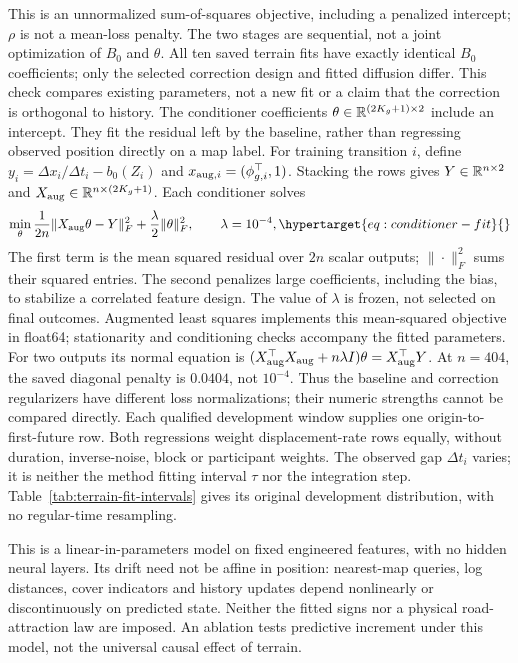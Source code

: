 This is an unnormalized sum-of-squares objective, including a penalized
intercept; \(\rho\) is not a mean-loss penalty. The two stages are sequential,
not a joint optimization of \(B_0\) and \(\theta\). All ten saved terrain fits
have exactly identical \(B_0\) coefficients; only the selected correction
design and fitted diffusion differ. This check compares existing parameters,
not a new fit or a claim that the correction is orthogonal to history.
The conditioner coefficients \(\theta\in\mathbb{R}^{(2K_g+1)\times2}\)
include an intercept. They fit the residual left by the baseline, rather than
regressing observed position directly on a map label.
For training transition \(i\), define
\(y_i=\Delta x_i/\Delta t_i-b_0(Z_i)\) and
\(x_{{\rm aug},i}=(\phi_{g,i}^\top,1)\).
Stacking the rows gives \(Y\in\mathbb{R}^{n\times2}\) and
\(X_{\rm aug}\in\mathbb{R}^{n\times(2K_g+1)}\).
Each conditioner solves
\begin{equation}
 \min_\theta\frac{1}{2n}\|X_{\rm aug}\theta-Y\|_F^2
       +\frac{\lambda}{2}\|\theta\|_F^2,\qquad\lambda=10^{-4},
 \label{eq:conditioner-fit}\hypertarget{eq:conditioner-fit}{}
\end{equation}
The first term is the mean squared residual over \(2n\) scalar outputs;
\(\|\cdot\|_F^2\) sums their squared entries. The second penalizes large
coefficients, including the bias, to stabilize a correlated feature design.
The value of \(\lambda\) is frozen, not selected on final outcomes.
Augmented least squares implements this mean-squared objective in float64;
stationarity and conditioning checks accompany the fitted parameters.
For two outputs its normal equation is
\((X_{\rm aug}^\top X_{\rm aug}+n\lambda I)\theta=X_{\rm aug}^\top Y\).
At \(n=404\), the saved diagonal penalty is \(0.0404\), not \(10^{-4}\).
Thus the baseline and correction regularizers have different loss
normalizations; their numeric strengths cannot be compared directly.
Each qualified development window supplies one origin-to-first-future row.
Both regressions weight displacement-rate rows equally, without duration,
inverse-noise, block or participant weights. The observed gap
\(\Delta t_i\) varies; it is neither the method fitting interval \(\tau\)
nor the integration step. Table~\ref{tab:terrain-fit-intervals} gives its
original development distribution, with no regular-time resampling.

This is a linear-in-parameters model on fixed engineered features, with no
hidden neural layers. Its drift need not be affine in position: nearest-map
queries, log distances, cover indicators and history updates depend
nonlinearly or discontinuously on predicted state. Neither the fitted signs
nor a physical road-attraction law are imposed. An ablation tests predictive
increment under this model, not the universal causal effect of terrain.

